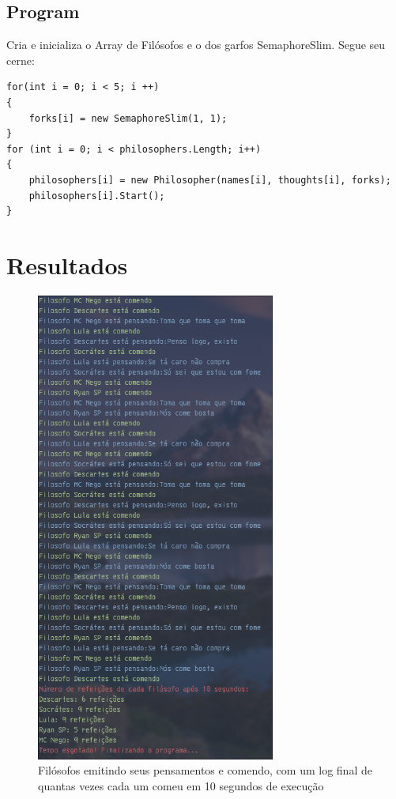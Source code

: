 \documentclass[
	12pt,				%
	oneside,			%
	a4paper,			%
	english,			%
	brazil,				%
	]{abntex2}
\begin{document}
{\subsection{Program}

Cria e inicializa o Array de Filósofos e o dos garfos SemaphoreSlim. Segue seu cerne:

\begin{lstlisting}
for(int i = 0; i < 5; i ++)
{
    forks[i] = new SemaphoreSlim(1, 1); 
}
for (int i = 0; i < philosophers.Length; i++)
{
    philosophers[i] = new Philosopher(names[i], thoughts[i], forks);
    philosophers[i].Start();
}
\end{lstlisting}

\section{Resultados}

\begin{figure}[H]
    \centering
    \includegraphics[width=0.7\textwidth]{img1.png}
    \caption{Filósofos emitindo seus pensamentos e comendo, com um log final de quantas vezes cada um comeu em 10 segundos de execução}
    \label{fig:img1}
\end{figure}
}
\end{document}
